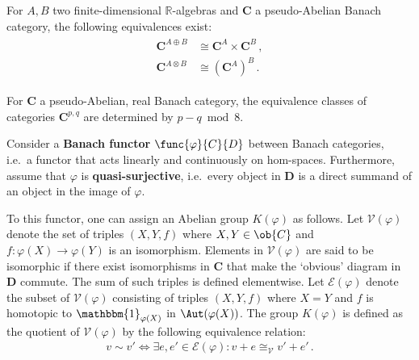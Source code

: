     \begin{property}
        For $A,B$ two finite-dimensional $\mathbb{R}$-algebras and $\mathbf{C}$ a pseudo-Abelian Banach category, the following equivalences exist:
        \begin{gather}
            \begin{aligned}
                \mathbf{C}^{A\oplus B}&\cong\mathbf{C}^A\times\mathbf{C}^B\,,\\
                \mathbf{C}^{A\otimes B}&\cong\left(\mathbf{C}^A\right)^B\,.
            \end{aligned}
        \end{gather}
    \end{property}
    \begin{property}\label{clifford:bott_periodicity_category}
        For $\mathbf{C}$ a pseudo-Abelian, real Banach category, the equivalence classes of categories $\mathbf{C}^{p,q}$ are determined by $p-q\bmod8$.
    \end{property}

    \begin{construct}\label{clifford:functor_k_group}
        Consider a \textbf{Banach functor} $\func{\varphi}{C}{D}$ between Banach categories, i.e.~a functor that acts linearly and continuously on hom-spaces. Furthermore, assume that $\varphi$ is \textbf{quasi-surjective}, i.e.~every object in $\mathbf{D}$ is a direct summand of an object in the image of $\varphi$.

        To this functor, one can assign an Abelian group $K(\varphi)$ as follows. Let $\mathscr{V}(\varphi)$ denote the set of triples $(X,Y,f)$ where $X,Y\in\ob{C}$ and $f:\varphi(X)\rightarrow\varphi(Y)$ is an isomorphism. Elements in $\mathscr{V}(\varphi)$ are said to be isomorphic if there exist isomorphisms in $\mathbf{C}$ that make the `obvious' diagram in $\mathbf{D}$ commute. The sum of such triples is defined elementwise. Let $\mathscr{E}(\varphi)$ denote the subset of $\mathscr{V}(\varphi)$ consisting of triples $(X,Y,f)$ where $X=Y$ and $f$ is homotopic to $\mathbbm{1}_{\varphi(X)}$ in $\Aut(\varphi(X))$. The group $K(\varphi)$ is defined as the quotient of $\mathscr{V}(\varphi)$ by the following equivalence relation:
        \begin{gather}
            v\sim v'\iff\exists e,e'\in\mathscr{E}(\varphi):v+e\cong_{\mathscr{V}}v'+e'\,.
        \end{gather}
    \end{construct}

